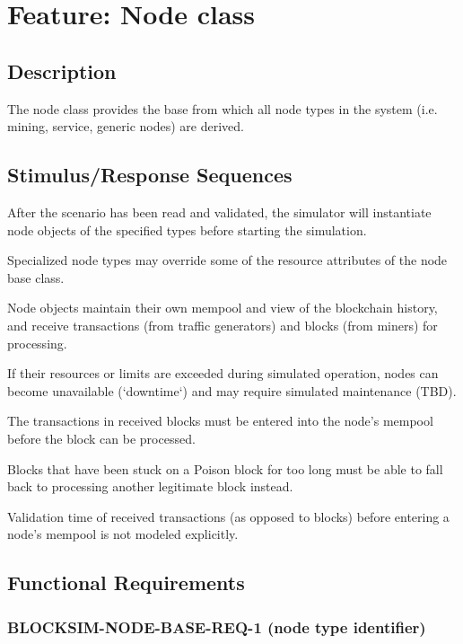 \documentclass{scrreprt}
\begin{document}
  \section{Feature: Node class}

    \subsection{Description}

      The node class provides the base from which all node types in the
      system (i.e. mining, service, generic nodes) are derived.

    \subsection{Stimulus/Response Sequences}

      After the scenario has been read and validated, the simulator will
      instantiate node objects of the specified types before starting the
      simulation.

      Specialized node types may override some of the resource attributes
      of the node base class.

      Node objects maintain their own mempool and view of the blockchain
      history, and receive transactions (from traffic generators) and blocks
      (from miners) for processing.

      If their resources or limits are exceeded during simulated operation,
      nodes can become unavailable (`downtime`) and may require simulated
      maintenance (TBD).

      The transactions in received blocks must be entered into the node's
      mempool before the block can be processed.

      Blocks that have been stuck on a Poison block for too long must be able
      to fall back to processing another legitimate block instead.

      Validation time of received transactions (as opposed to blocks) before
      entering a node's mempool is not modeled explicitly.

    \subsection{Functional Requirements}

      \subsubsection{BLOCKSIM-NODE-BASE-REQ-1 (node type identifier)}
\end{document}
